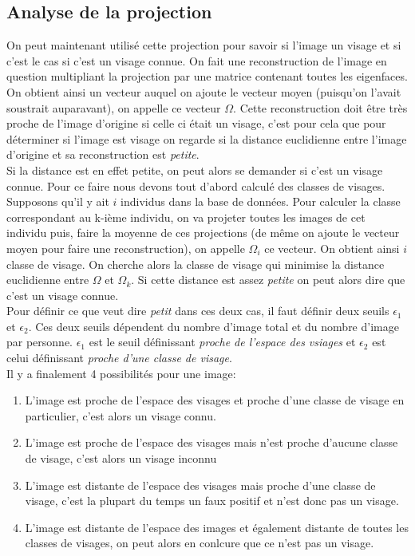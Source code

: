 \documentclass[12pt,french]{article}
\theoremstyle{plain}
\theoremstyle{definition}
\begin{document}
\subsection{Analyse de la projection}
On peut maintenant utilisé cette projection pour savoir si l'image un visage et si c'est le cas si c'est un visage connue.
On fait une reconstruction de l'image en question multipliant la projection par une matrice contenant toutes les eigenfaces. On obtient ainsi un vecteur auquel on ajoute le vecteur moyen (puisqu'on l'avait soustrait auparavant), on appelle ce vecteur $\Omega$.
Cette reconstruction doit être très proche de l'image d'origine si celle ci était un visage, c'est pour cela que pour déterminer si l'image est visage on regarde si la distance euclidienne entre l'image d'origine et sa reconstruction est \emph{petite}.\\
Si la distance est en effet petite, on peut alors se demander si c'est un visage connue. Pour ce faire nous devons tout d'abord calculé des classes de visages.\\
Supposons qu'il y ait $i$ individus dans la base de données. Pour calculer la classe correspondant au k-ième individu, on va projeter toutes les images de cet individu puis, faire la moyenne de ces projections (de même on ajoute le vecteur moyen pour faire une reconstruction), on appelle $\Omega_i$ ce vecteur. On obtient ainsi $i$ classe de visage. On cherche alors la classe de visage qui minimise la distance euclidienne entre $\Omega$ et $\Omega_k$. Si cette distance est assez \emph{petite} on peut alors dire que c'est un visage connue. \\
Pour définir ce que veut dire \emph{petit} dans ces deux cas, il faut définir deux seuils $\epsilon_1$ et $\epsilon_2$. Ces deux seuils dépendent du nombre d'image total et du nombre d'image par personne. $\epsilon_1$ est le seuil définissant \emph{proche de l'espace des vsiages} et $\epsilon_2$ est celui définissant \emph{proche d'une classe de visage}.\\

Il y a finalement 4 possibilités pour une image:
\begin{enumerate}
  \item L'image est proche de l'espace des visages et proche d'une classe de visage en particulier, c'est alors un visage connu.
  \item L'image est proche de l'espace des visages mais n'est proche d'aucune classe de visage, c'est alors un visage inconnu
  \item L'image est distante de l'espace des visages mais proche d'une classe de visage, c'est la plupart du temps un faux positif et n'est donc pas un visage.
  \item L'image est distante de l'espace des images et également distante de toutes les classes de visages, on peut alors en conlcure que ce n'est pas un visage.
\end{enumerate}
\end{document}
